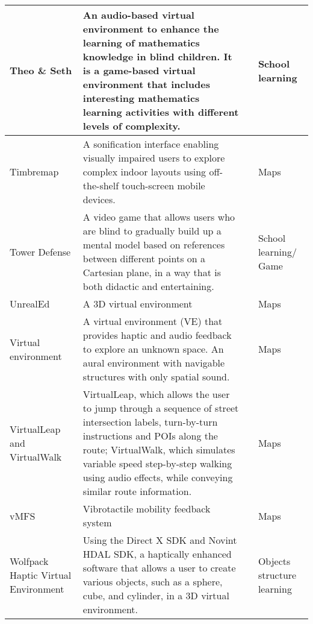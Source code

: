 \begin{small}
\begin{longtable}[h]{m{2.5cm}m{5cm}m{3cm}m{2cm}}
            Theo \& Seth & An audio-based virtual environment to enhance the learning of mathematics knowledge in blind children. It is a game-based virtual environment that includes interesting mathematics learning activities with different levels of complexity. & {\tiny \cite{Sanchez2005}} & School learning \\ \hline
            
            Timbremap & A sonification interface enabling visually impaired users to explore complex indoor layouts using off-the-shelf touch-screen mobile devices. & {\tiny \cite{Su2010}} & Maps \\ \hline
            
            Tower Defense & A video game that allows users who are blind to gradually build up a mental model based on references between different points on a Cartesian plane, in a way that is both didactic and entertaining. & {\tiny \cite{Espinoza2014}} & School learning$/$Game \\ \hline
            
            UnrealEd & A 3D virtual environment & {\tiny \cite{Villane2009}} & Maps \\ \hline
            
            Virtual environment & A virtual environment (VE) that provides haptic and audio feedback to explore an unknown space. An aural environment with navigable structures with only spatial sound. & {\tiny \cite{Lahav2008b,Sanchez2000}} & Maps \\ \hline
            
            VirtualLeap and VirtualWalk & VirtualLeap, which allows the user to jump through a sequence of street intersection labels, turn-by-turn instructions and POIs along the route; VirtualWalk, which simulates variable speed step-by-step walking using audio effects, while conveying similar route information. & {\tiny \cite{Guerreiro2017}} & Maps \\ \hline
            
            vMFS & Vibrotactile mobility feedback system & {\tiny \cite{Adebiyi2017}} & Maps \\ \hline
            
            Wolfpack Haptic Virtual Environment & Using the Direct X SDK and Novint HDAL SDK, a haptically enhanced software that allows a user to create various objects, such as a sphere, cube, and cylinder, in a 3D virtual environment. & {\tiny \cite{Lee2014a}} & Objects structure learning \\ 

            
\end{longtable}

\end{small}